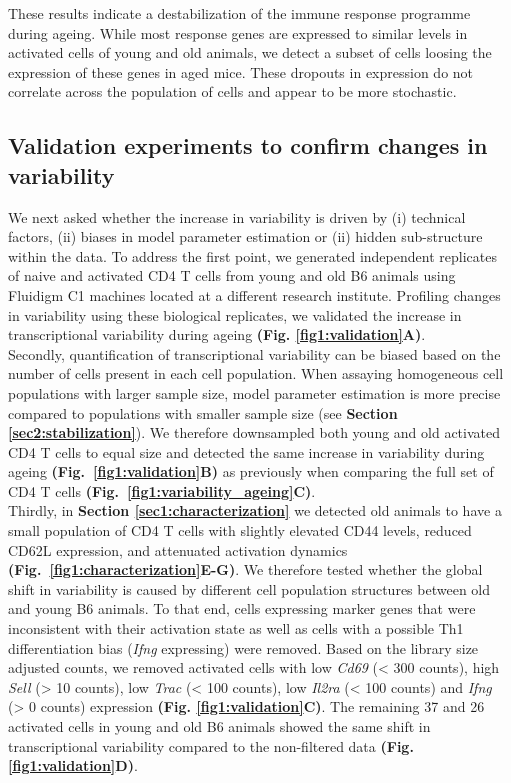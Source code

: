 \newpage

These results indicate a destabilization of the immune response programme during ageing. While most response genes are expressed to similar levels in activated cells of young and old animals, we detect a subset of cells loosing the expression of these genes in aged mice. These dropouts in expression do not correlate across the population of cells and appear to be more stochastic. 

\subsection{Validation experiments to confirm changes in variability}

We next asked whether the increase in variability is driven by (i) technical factors, (ii) biases in model parameter estimation or (ii) hidden sub-structure within the data. To address the first point, we generated independent replicates of naive and activated CD4\plus{} T cells from young and old B6 animals using Fluidigm C1 machines located at a different research institute. Profiling changes in variability using these biological replicates, we validated the increase in transcriptional variability during ageing \textbf{(Fig. \ref{fig1:validation}A)}.\\

Secondly, quantification of transcriptional variability can be biased based on the number of cells present in each cell population. When assaying homogeneous cell populations with larger sample size, model parameter estimation is more precise compared to populations with smaller sample size (see \textbf{Section \ref{sec2:stabilization}}). We therefore downsampled both young and old activated CD4\plus{} T cells to equal size and detected the same increase in variability during ageing \textbf{(Fig.~\ref{fig1:validation}B)} as previously when comparing the full set of CD4\plus{} T cells \textbf{(Fig.~\ref{fig1:variability_ageing}C)}. \\

Thirdly, in \textbf{Section \ref{sec1:characterization}} we detected old animals to have a small population of CD4\plus{} T cells with slightly elevated CD44 levels, reduced CD62L expression, and attenuated activation dynamics \textbf{(Fig.~\ref{fig1:characterization}E-G)}. We therefore tested whether the global shift in variability is caused by different cell population structures between old and young B6 animals. To that end, cells expressing marker genes that were inconsistent with their activation state as well as cells with a possible Th1 differentiation bias (\textit{Ifng} expressing) were removed. Based on the library size adjusted counts, we removed activated cells with low \textit{Cd69} (< 300 counts), high \textit{Sell} (> 10 counts), low \textit{Trac} (< 100 counts), low \textit{Il2ra} (< 100 counts) and \textit{Ifng} (> 0 counts) expression \textbf{(Fig. \ref{fig1:validation}C)}. The remaining 37 and 26 activated cells in young and old B6 animals showed the same shift in transcriptional variability compared to the non-filtered data \textbf{(Fig. \ref{fig1:validation}D)}. 

